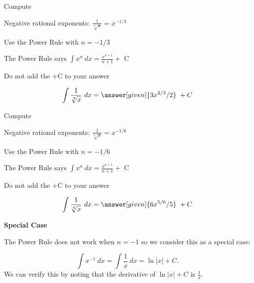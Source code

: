 \documentclass{ximera}
\begin{document}
\begin{problem} %
Compute 

\begin{hint}
Negative rational exponents: $\frac{1}{\sqrt[3]x} = x^{-1/3}$
\end{hint}
\begin{hint}
Use the Power Rule with $n=-1/3$
\end{hint}
\begin{hint}
The Power Rule says $\int x^n \ dx = \frac{x^{n+1}}{n+1} +$ C
\end{hint}
\begin{hint}
\begin{center}
Do not add the +C to your answer
\end{center}
\end{hint}

\[
\int \frac{1}{\sqrt[3]x} \ dx =
\answer[given]{3x^{2/3} /2} \ + C
\]
\end{problem}



\begin{problem} %
Compute 

\begin{hint}
Negative rational exponents: $\frac{1}{\sqrt[6]x} = x^{-1/6}$
\end{hint}
\begin{hint}
Use the Power Rule with $n=-1/6$
\end{hint}
\begin{hint}
The Power Rule says $\int x^n \ dx = \frac{x^{n+1}}{n+1} +$ C
\end{hint}
\begin{hint}
\begin{center}
Do not add the +C to your answer
\end{center}
\end{hint}

\[
\int \frac{1}{\sqrt[6]x} \ dx =
\answer[given]{6x^{5/6} /5} \ + C
\]
\end{problem}



\begin{center}
\textbf{Special Case}
\end{center}

The Power Rule does not work when $n = -1$ so we consider this as a special case:

\[\int x^{-1} \ dx = \int \frac{1}{x}  \ dx = \ln |x| +C.\]
We can verify this by noting that the derivative of $\ln|x| + C$ is $\displaystyle{\frac{1}{x}}$.
\end{document}
